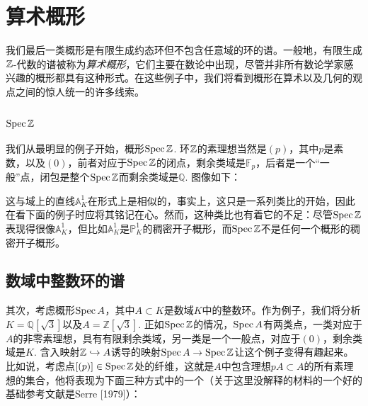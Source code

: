 \section{算术概形}

我们最后一类概形是有限生成约态环但不包含任意域的环的谱。一般地，有限生成$\mathbb{Z}$-代数的谱被称为\textit{算术概形}，它们主要在数论中出现，尽管并非所有数论学家感兴趣的概形都具有这种形式。在这些例子中，我们将看到概形在算术以及几何的观点之间的惊人统一的许多线索。\nottran

\subsection{$\operatorname{Spec} \mathbb{Z}$}

我们从最明显的例子开始，概形$\operatorname{Spec} \mathbb{Z}$. 环$\mathbb{Z}$的素理想当然是$(p)$，其中$p$是素数，以及$(0)$，前者对应于$\operatorname{Spec} \mathbb{Z}$的闭点，剩余类域是$\mathbb{F}_p$，后者是一个“一般”点，闭包是整个$\operatorname{Spec} \mathbb{Z}$而剩余类域是$\mathbb{Q}$. 图像如下：


\noindent 这与域上的直线$\mathbb{A}_K^1$在形式上是相似的，事实上，这只是一系列类比的开始，因此在看下面的例子时应将其铭记在心。然而，这种类比也有着它的不足：尽管$\operatorname{Spec} \mathbb{Z}$表现得很像$\mathbb{A}_K^1$，但比如$\mathbb{A}_K^1$是$\mathbb{P}_K^1$的稠密开子概形，而$\operatorname{Spec} \mathbb{Z}$不是任何一个概形的稠密开子概形。

\subsection{数域中整数环的谱}

其次，考虑概形$\operatorname{Spec} A$，其中$A\subset K$是数域$K$中的整数环。作为例子，我们将分析$K=\mathbb{Q}[\sqrt{3}]$以及$A=\mathbb{Z}[\sqrt{3}]$. 正如$\operatorname{Spec} \mathbb{Z}$的情况，$\operatorname{Spec} A$有两类点，一类对应于$A$的非零素理想，具有有限剩余类域，另一类是一个一般点，对应于$(0)$，剩余类域是$K$. 含入映射$\mathbb{Z}\hookrightarrow A$诱导的映射$\operatorname{Spec} A\to \operatorname{Spec} \mathbb{Z}$让这个例子变得有趣起来。比如说，考虑点$[(p)]\in \operatorname{Spec} \mathbb{Z}$处的纤维，这就是$A$中包含理想$pA\subset A$的所有素理想的集合，他将表现为下面三种方式中的一个（关于这里没解释的材料的一个好的基础参考文献是Serre [1979]）：

